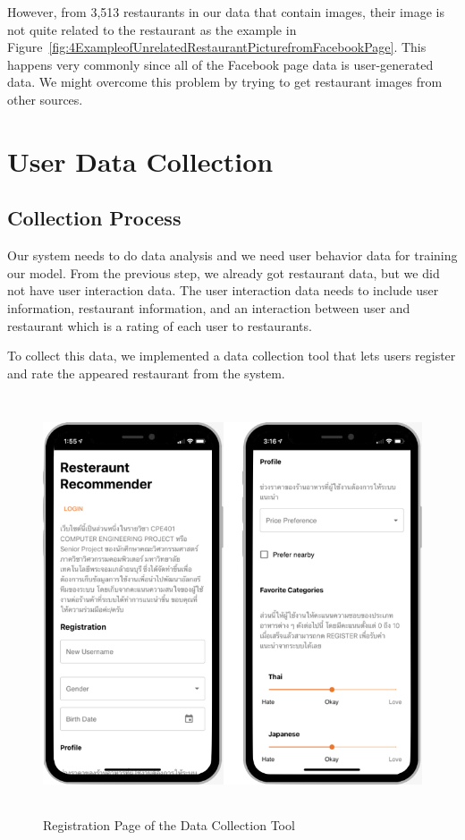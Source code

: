 \documentclass[12pt,oneside,openright,a4paper]{cpe-english-project}
\begin{document}
However, from 3,513 restaurants in our data that contain images, their image is not quite related to the restaurant as the example in Figure~\ref{fig:4ExampleofUnrelatedRestaurantPicturefromFacebookPage}. This happens very commonly since all of the Facebook page data is user-generated data. We might overcome this problem by trying to get restaurant images from other sources.


\section{User Data Collection}

\subsection{Collection Process}

Our system needs to do data analysis and we need user behavior data for training our model. From the previous step, we already got restaurant data, but we did not have user interaction data. The user interaction data needs to include user information, restaurant information, and an interaction between user and restaurant which is a rating of each user to restaurants.

To collect this data, we implemented a data collection tool that lets users register and rate the appeared restaurant from the system.

\begin{figure}[H]\centering
\includegraphics[height=350pt]{./images/4RegistrationPageoftheDataCollectionTool.png}
\caption{Registration Page of the Data Collection Tool}\label{fig:4RegistrationPageoftheDataCollectionTool}
\end{figure}
\end{document}
